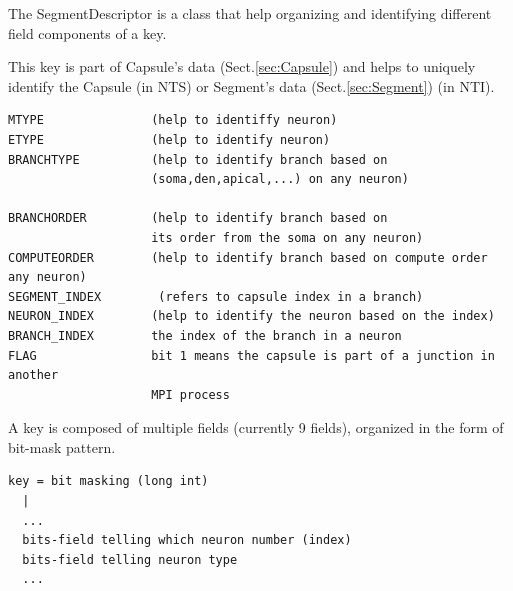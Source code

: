 The SegmentDescriptor is a class that help organizing and identifying
different field components of a key.

This key is part of Capsule's data (Sect.\ref{sec:Capsule}) and helps to
uniquely identify the Capsule (in NTS) or Segment's data (Sect.\ref{sec:Segment}) (in NTI). 

\begin{verbatim}
MTYPE               (help to identiffy neuron)
ETYPE               (help to identify neuron)
BRANCHTYPE          (help to identify branch based on 
                    (soma,den,apical,...) on any neuron)
                    
BRANCHORDER         (help to identify branch based on
                    its order from the soma on any neuron)
COMPUTEORDER        (help to identify branch based on compute order any neuron)
SEGMENT_INDEX        (refers to capsule index in a branch) 
NEURON_INDEX        (help to identify the neuron based on the index)
BRANCH_INDEX        the index of the branch in a neuron 
FLAG                bit 1 means the capsule is part of a junction in another
                    MPI process
\end{verbatim}
%                     

A key is composed of multiple fields (currently 9 fields), organized in the
form of bit-mask pattern.
\begin{verbatim}
key = bit masking (long int)
  | 
  ...
  bits-field telling which neuron number (index)
  bits-field telling neuron type
  ...
\end{verbatim}

